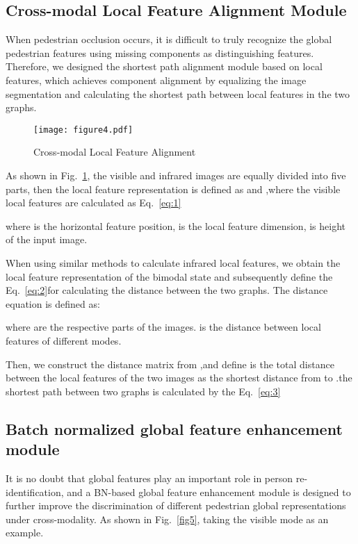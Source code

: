 \documentclass[journal]{IEEEtran}
\begin{document}
\subsection{Cross-modal Local Feature Alignment Module}
When pedestrian occlusion occurs, it is difficult to truly recognize the global pedestrian features using missing components as distinguishing features. Therefore, we designed the shortest path alignment module based on local features, which achieves component alignment by equalizing the image segmentation and calculating the shortest path between local features in the two graphs.
\vspace{-0.8cm}
\begin{figure}[ht]
\centering
\texttt{[image: figure4.pdf]}
\vspace{-.05in}
\caption{Cross-modal Local Feature Alignment}
\label{fig4}
\end{figure}

As shown in Fig.~\ref{fig4}, the visible and infrared images are equally divided into five parts, then the local feature representation is defined as  and ,where the visible local features are calculated as Eq.~\ref{eq:1}
	
	where  is the horizontal feature position,  is the local feature dimension,  is height of the input image.
	
	When using similar methods to calculate infrared local features, we obtain the local feature representation of the bimodal state and subsequently define the Eq.~\ref{eq:2}for calculating the distance between the two graphs. The distance equation is defined as:
	
	where  are the respective parts of the images.  is the distance between local features of different modes. 
	
	Then, we construct the distance matrix  from  ,and define   is the total distance between the local features of the two images as the shortest distance from  to .the shortest path between two graphs is calculated by the Eq.~\ref{eq:3}
	
	


\subsection{Batch normalized global feature enhancement module}
It is no doubt that global features play an important role in person re-identification, and a BN-based global feature enhancement module is designed to further improve the discrimination of different pedestrian global representations under cross-modality. As shown in  Fig.~\ref{fig5}, taking the visible mode as an example.
\end{document}
